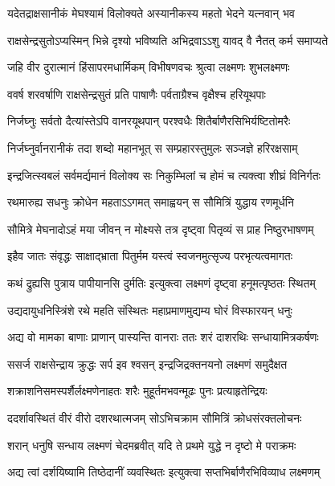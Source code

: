 \twolineshloka
{यदेतद्राक्षसानीकं मेघश्यामं विलोक्यते}
{अस्यानीकस्य महतो भेदने यत्नवान् भव} %

\twolineshloka
{राक्षसेन्द्रसुतोऽप्यस्मिन् भिन्ने दृश्यो भविष्यति}
{अभिद्रवाऽऽशु यावद् वै नैतत् कर्म समाप्यते} %

\twolineshloka
{जहि वीर दुरात्मानं हिंसापरमधार्मिकम्}
{विभीषणवचः श्रुत्वा लक्ष्मणः शुभलक्ष्मणः} %

\twolineshloka
{ववर्ष शरवर्षाणि राक्षसेन्द्रसुतं प्रति}
{पाषाणैः पर्वताग्रैश्च वृक्षैश्च हरियूथपाः} %

\twolineshloka
{निर्जघ्नुः सर्वतो दैत्यांस्तेऽपि वानरयूथपान्}
{परश्वधैः शितैर्बाणैरसिभिर्यष्टितोमरैः} %

\twolineshloka
{निर्जघ्नुर्वानरानीकं तदा शब्दो महानभूत्}
{स सम्प्रहारस्तुमुलः सञ्जज्ञे हरिरक्षसाम्} %

\twolineshloka
{इन्द्रजित्स्वबलं सर्वमर्द्यमानं विलोक्य सः}
{निकुम्भिलां च होमं च त्यक्त्वा शीघ्रं विनिर्गतः} %

\twolineshloka
{रथमारुह्य सधनुः क्रोधेन महताऽऽगमत्}
{समाह्वयन् स सौमित्रिं युद्धाय रणमूर्धनि} %

\twolineshloka
{सौमित्रे मेघनादोऽहं मया जीवन् न मोक्ष्यसे}
{तत्र दृष्ट्वा पितृव्यं स प्राह निष्ठुरभाषणम्} %

\twolineshloka
{इहैव जातः संवृद्धः साक्षाद्\mbox{}भ्राता पितुर्मम}
{यस्त्वं स्वजनमुत्सृज्य परभृत्यत्वमागतः} %

\twolineshloka
{कथं द्रुह्यसि पुत्राय पापीयानसि दुर्मतिः}
{इत्युक्त्वा लक्ष्मणं दृष्ट्वा हनूमत्पृष्ठतः स्थितम्} %

\twolineshloka
{उद्यदायुधनिस्त्रिंशे रथे महति संस्थितः}
{महाप्रमाणमुद्यम्य घोरं विस्फारयन् धनुः} %

\twolineshloka
{अद्य वो मामका बाणाः प्राणान् पास्यन्ति वानराः}
{ततः शरं दाशरथिः सन्धायामित्रकर्षणः} %

\twolineshloka
{ससर्ज राक्षसेन्द्राय क्रुद्धः सर्प इव श्वसन्}
{इन्द्रजिद्रक्तनयनो लक्ष्मणं समुदैक्षत} %

\twolineshloka
{शक्राशनिसमस्पर्शैर्लक्ष्मणेनाहतः शरैः}
{मुहूर्तमभवन्मूढः पुनः प्रत्याहृतेन्द्रियः} %

\twolineshloka
{ददर्शावस्थितं वीरं वीरो दशरथात्मजम्}
{सोऽभिचक्राम सौमित्रिं क्रोधसंरक्तलोचनः} %

\twolineshloka
{शरान् धनुषि सन्धाय लक्ष्मणं चेदमब्रवीत्}
{यदि ते प्रथमे युद्धे न दृष्टो मे पराक्रमः} %

\twolineshloka
{अद्य त्वां दर्शयिष्यामि तिष्ठेदानीं व्यवस्थितः}
{इत्युक्त्वा सप्तभिर्बाणैरभिविव्याध लक्ष्मणम्} %

